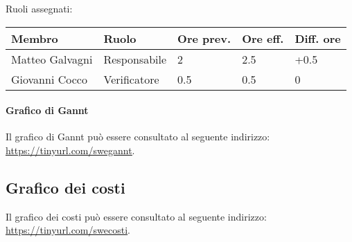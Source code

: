 \documentclass[a4paper, 12pt]{article}
\begin{document}
Ruoli assegnati:\\[0.5em]
\begin{tabular}{|l|l|l|l|l|}\hline
Membro & Ruolo & Ore prev. & Ore eff. & Diff. ore \\\hline
Matteo Galvagni & Responsabile & 2 & 2.5 & +0.5 \\\hline
Giovanni Cocco & Verificatore & 0.5 & 0.5 & 0 \\\hline
\end{tabular}

\paragraph{Grafico di Gannt}
Il grafico di Gannt può essere consultato al seguente indirizzo: \underline{\href{https://tinyurl.com/swegannt}{https://tinyurl.com/swegannt}}.


\subsection{Grafico dei costi}
Il grafico dei costi può essere consultato al seguente indirizzo: \underline{\href{https://tinyurl.com/swecosti}{https://tinyurl.com/swecosti}}.
\end{document}
